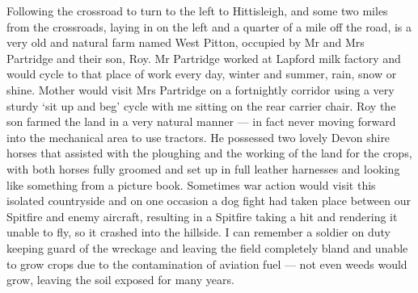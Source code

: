 Following the crossroad to turn to the left to Hittisleigh, and some two miles
from the crossroads, laying in on the left and a quarter of a mile off the
road, is a very old and natural farm named West Pitton, occupied by Mr and Mrs
Partridge and their son, Roy. Mr Partridge worked at Lapford milk factory and
would cycle to that place of work every day, winter and summer, rain, snow or
shine. Mother would visit Mrs Partridge on a fortnightly corridor using a very
sturdy `sit up and beg' cycle with me sitting on the rear carrier chair. Roy
the son farmed the land in a very natural manner --- in fact never moving
forward into the mechanical area to use tractors. He possessed two lovely
Devon shire horses that assisted with the ploughing and the working of the land
for the crops, with both horses fully groomed and set up in full leather
harnesses and looking like something from a picture book. Sometimes war action
would visit this isolated countryside and on one occasion a dog fight had taken
place between our Spitfire and enemy aircraft, resulting in a Spitfire taking a
hit and rendering it unable to fly, so it crashed into the hillside. I can
remember a soldier on duty keeping guard of the wreckage and leaving the field
completely bland and unable to grow crops due to the contamination of aviation
fuel --- not even weeds would grow, leaving the soil exposed for many years.

